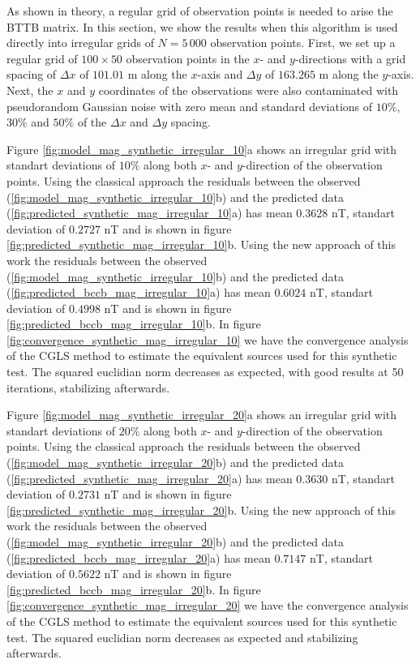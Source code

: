 As shown in theory, a regular grid of observation points is needed to arise the BTTB matrix. In this section, we show the results when this algorithm is used directly into irregular grids of $N = 5 \, 000$ observation points. 
First, we set up a regular grid of $100 \times 50$ observation points in the $x$- and $y$-directions with a grid spacing of $\Delta x$ of $101.01$ m along the $x$-axis and $\Delta y$ of
$163.265$ m along the $y$-axis. Next, the $x$ and $y$ coordinates of the observations were also contaminated with pseudorandom Gaussian noise with zero mean and standard deviations of $10\%$, $30\%$ and $50\%$ of the $\Delta x$ and $\Delta y$ spacing.

Figure \ref{fig:model_mag_synthetic_irregular_10}a shows an irregular grid with standart deviations of $10\%$ along both $x$- and $y$-direction of the observation points. Using the classical approach the residuals between the observed (\ref{fig:model_mag_synthetic_irregular_10}b) and the predicted data (\ref{fig:predicted_synthetic_mag_irregular_10}a) has mean $0.3628$ nT, standart deviation of $0.2727$ nT and is shown in figure \ref{fig:predicted_synthetic_mag_irregular_10}b. Using the new approach of this work the residuals between the observed (\ref{fig:model_mag_synthetic_irregular_10}b) and the predicted data (\ref{fig:predicted_bccb_mag_irregular_10}a) has mean $0.6024$ nT, standart deviation of $0.4998$ nT and is shown in figure \ref{fig:predicted_bccb_mag_irregular_10}b.
In figure \ref{fig:convergence_synthetic_mag_irregular_10} we have the convergence analysis of the CGLS method to estimate the equivalent sources used for this synthetic test. The squared euclidian norm decreases as expected, with good results at 50 iterations, stabilizing afterwards.

Figure \ref{fig:model_mag_synthetic_irregular_20}a shows an irregular grid with standart deviations of $20\%$ along both $x$- and $y$-direction of the observation points. Using the classical approach the residuals between the observed (\ref{fig:model_mag_synthetic_irregular_20}b) and the predicted data (\ref{fig:predicted_synthetic_mag_irregular_20}a) has mean $0.3630$ nT, standart deviation of $0.2731$ nT and is shown in figure \ref{fig:predicted_synthetic_mag_irregular_20}b. Using the new approach of this work the residuals between the observed (\ref{fig:model_mag_synthetic_irregular_20}b) and the predicted data (\ref{fig:predicted_bccb_mag_irregular_20}a) has mean $0.7147$ nT, standart deviation of $0.5622$ nT and is shown in figure \ref{fig:predicted_bccb_mag_irregular_20}b.
In figure \ref{fig:convergence_synthetic_mag_irregular_20} we have the convergence analysis of the CGLS method to estimate the equivalent sources used for this synthetic test. The squared euclidian norm decreases as expected and stabilizing afterwards.

